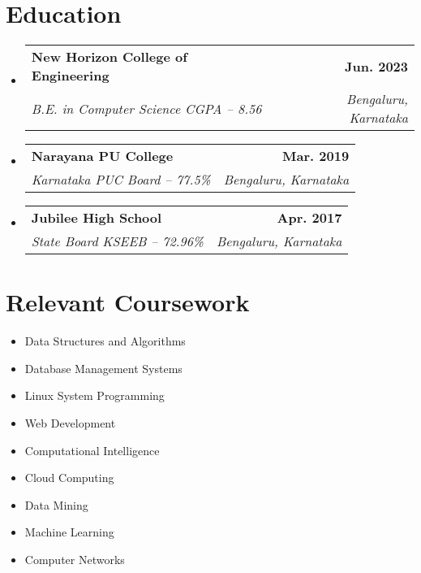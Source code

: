\documentclass[letterpaper,11pt]{article}
\makeatletter
\newcommand{\resumeSubheading}[4]{
  \vspace{-2pt}\item
    \begin{tabular*}{1.0\textwidth}[t]{l@{\extracolsep{\fill}}r}
      \textbf{#1} & \textbf{\small #2} \\
      \textit{\small#3} & \textit{\small #4} \\
    \end{tabular*}\vspace{-7pt}
}
\newcommand{\resumeSubHeadingListStart}{\begin{itemize}[leftmargin=0.0in, label={}]}
\newcommand{\resumeSubHeadingListEnd}{\end{itemize}}
\makeatother
\begin{document}
    \vspace{-18pt}



\section{Education}
\begin{itemize}[leftmargin=0.08in, label={}]
    \small{\item{
        \resumeSubHeadingListStart
            \resumeSubheading{New Horizon College of Engineering }{Jun. 2023}
             {B.E. in Computer Science CGPA -- 8.56}{Bengaluru, Karnataka}
        \resumeSubHeadingListEnd
        \vspace{-4pt}
        \resumeSubHeadingListStart
            \resumeSubheading{Narayana PU College }{Mar. 2019}
             {Karnataka PUC Board -- 77.5\%}{Bengaluru, Karnataka}
        \resumeSubHeadingListEnd
        \vspace{-9pt}
        \resumeSubHeadingListStart
            \resumeSubheading {Jubilee High School}{Apr. 2017}
             {State Board KSEEB -- 72.96\% }{Bengaluru, Karnataka}
        \resumeSubHeadingListEnd
    }}
 \end{itemize}
 

\section{Relevant Coursework}
        {\begin{multicols}{3}
            \begin{itemize}[itemsep=-5pt, parsep=10pt]
                \item Data Structures and Algorithms
                \item Database Management Systems
                \item Linux System Programming
                \item Web Development
                \item Computational Intelligence
                \item Cloud Computing
                \item Data Mining
                \item Machine Learning
                \item Computer Networks
            \end{itemize}
        \end{multicols}}
        
\end{document}
